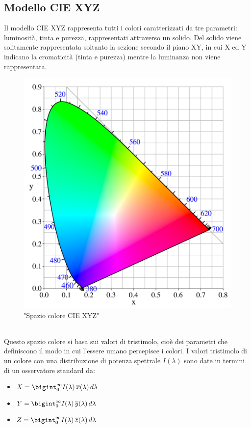 \documentclass[a4paper,11pt]{article}
\begin{document}
        \subsection{Modello CIE XYZ}
        Il modello CIE XYZ rappresenta tutti i colori caratterizzati da tre parametri: luminosità, tinta e purezza, rappresentati attraverso un solido. 
        Del solido viene solitamente rappresentata soltanto la sezione secondo il piano XY, in cui X ed Y indicano la cromaticità (tinta e purezza) mentre la luminanza non viene rappresentata.
        \begin{figure}[h]
            \centering
            \includegraphics[scale=0.2]{CIEXYZ.png}
            \caption{"Spazio colore CIE XYZ"}
        \end{figure}
        \\Questo spazio colore si basa sui valori di tristimolo, cioè dei parametri che definiscono il modo in cui l'essere umano percepisce i colori. 
        I valori tristimolo di un colore con una distribuzione di potenza spettrale $I(\lambda)$  sono date in termini di un osservatore standard da:

        \begin{itemize}      
            \item[] \Large $X = \bigint_0^\infty I(\lambda)\,\overline{x}(\lambda)\,d\lambda$
            \item[] \Large $Y = \bigint_0^\infty I(\lambda)\,\overline{y}(\lambda)\,d\lambda$
            \item[] \Large $Z = \bigint_0^\infty I(\lambda)\,\overline{z}(\lambda)\,d\lambda$
        \end{itemize}
        
\end{document}
